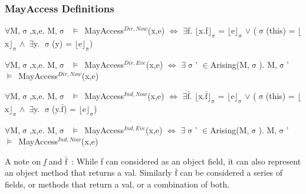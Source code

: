 \documentclass[a4paper,11pt, twoside,twocolumn]{article}
\newenvironment{logic}[1][null]
{\begin{flushleft} \small \label{#1}}
{\end{flushleft}}
\newcommand{\loin}{$\in$}
\newcommand{\loforall}{$\forall$}
\newcommand{\loexists}{$\exists$}
\newcommand{\loand}{$\land$}
\newcommand{\loor} {$\lor$}
\newcommand{\losigma}{$\upsigma$}
\newcommand{\loturns} {$\vDash$}
\newcommand{\loiff} {$\iff$}
\newcommand{\loexec}[2] {$\lfloor$#1$\rfloor _{\text{#2}}$}
\newcommand{\loconj}[1] {$\bar{\text{#1}}$}
\newcommand{\ablock} {\null\qquad}
\begin{document}
\subsubsection{MayAccess Definitions}
\begin{logic}[MayAccessDirNow]
\loforall M,\losigma,x,e. M,\losigma\ \loturns\ MayAccess$^{Dir,Now}$(x,e) \loiff \linebreak
\ablock \loexists f. \loexec{x.f}{\losigma} = \loexec{e}{\losigma}
\loor \linebreak
\ablock (\losigma(this) = \loexec{x}{\losigma} \loand\ \loexists y. \losigma(y) = \loexec{e}{\losigma})
\end{logic}
\begin{logic}[MayAccessDirEve]
\loforall M,\losigma,x,e. M,\losigma\ \loturns\ MayAccess$^{Dir,Eve}$(x,e) \loiff \linebreak
\ablock \loexists \losigma' \loin Arising(M,\losigma).\linebreak
\ablock M,\losigma'\ \loturns\ MayAccess$^{Dir,Now}$(x,e) 
\end{logic}
\begin{logic}[MayAccessIndNow]
\loforall M,\losigma,x,e. M,\losigma\ \loturns\ MayAccess$^{Ind,Now}$(x,e) \loiff \linebreak
\ablock \loexists \loconj{f}. \loexec{x.\loconj{f}}{\losigma} = \loexec{e}{\losigma}
\loor \linebreak
\ablock (\losigma(this) = \loexec{x}{\losigma} \loand\ \loexists y. \losigma(y.\loconj{f}) = \loexec{e}{\losigma})
\end{logic}
\begin{logic}[MayAccessIndEve]
\loforall M,\losigma,x,e. M,\losigma\ \loturns\ MayAccess$^{Ind,Eve}$(x,e) \loiff \linebreak
\ablock \loexists \losigma' \loin Arising(M,\losigma).\linebreak
\ablock M,\losigma'\ \loturns\ MayAccess$^{Ind,Now}$(x,e) 
\end{logic}
A note on \textit{f} and \textit{\loconj{f}}\ : While f can considered as an object field, it can also represent an object method that returns a val.
Similarly \loconj{f} can be considered a series of fields, or methods that return a val, or a combination of both.\\
\end{document}
